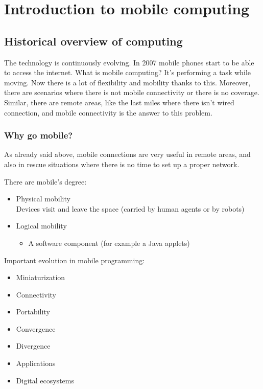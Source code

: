 \chapter{Introduction to mobile computing}

\section{Historical overview of computing}
The technology is continuously evolving. In 2007 mobile phones start to be able 
to access the internet.
What is mobile computing? It's performing a task while moving. Now there is a 
lot of flexibility and mobility thanks to this. Moreover, there are scenarios 
where there is not mobile connectivity or there is no coverage. Similar, there 
are remote areas, like the last miles where there isn't wired connection, and 
mobile connectivity is the answer to this problem.

\subsection{Why go mobile?}
As already said above, mobile connections are very useful in remote areas, and 
also in rescue situations where there is no time to set up a proper network.

There are mobile's degree:
\begin{itemize}
  \item Physical mobility \\
  Devices visit and leave the space (carried by human agents or by robots)
  \item Logical mobility
  \begin{itemize}
    \item A software component (for example a Java applets)
  \end{itemize}
\end{itemize}

Important evolution in mobile programming:
\begin{itemize}
  \item Miniaturization
  \item Connectivity
  \item Portability
  \item Convergence
  \item Divergence
  \item Applications
  \item Digital ecosystems
\end{itemize}

